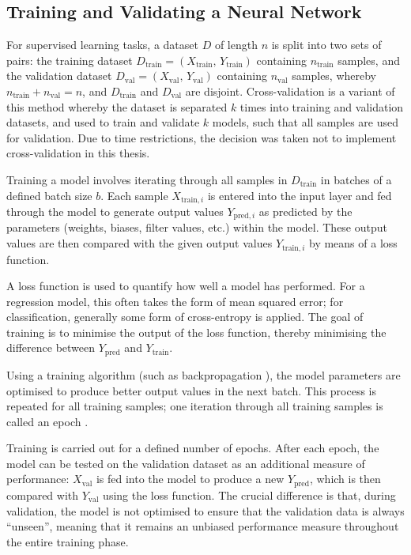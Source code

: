 \subsection{Training and Validating a Neural Network}
For supervised learning tasks, a dataset \(D\) of length \(n\) is split into two sets of pairs: the training dataset \(D_{\text{train}} = \left(X_{\text{train}},\,Y_{\text{train}}\right)\) containing \(n_{\text{train}}\) samples, and the validation dataset \(D_{\text{val}} = \left(X_{\text{val}},\,Y_{\text{val}}\right)\) containing \(n_{\text{val}}\) samples, whereby \(n_{\text{train}} + n_{\text{val}} = n\), and \(D_{\text{train}}\) and \(D_{\text{val}}\) are disjoint. Cross-validation is a variant of this method whereby the dataset is separated \(k\) times into training and validation datasets, and used to train and validate \(k\) models, such that all samples are used for validation. Due to time restrictions, the decision was taken not to implement cross-validation in this thesis.

Training a model involves iterating through all samples in \(D_{\text{train}}\) in batches of a defined batch size \(b\). Each sample \(X_{\text{train}, i}\) is entered into the input layer and fed through the model to generate output values \(Y_{\text{pred}, i}\) as predicted by the parameters (weights, biases, filter values, etc.) within the model. These output values are then compared with the given output values \(Y_{\text{train}, i}\) by means of a loss function.

A loss function is used to quantify how well a model has performed. For a regression model, this often takes the form of mean squared error; for classification, generally some form of cross-entropy is applied. The goal of training is to minimise the output of the loss function, thereby minimising the difference between \(Y_{\text{pred}}\) and \(Y_{\text{train}}\).

Using a training algorithm (such as backpropagation \cite[p. 204]{goodfellow_deep_2016}), the model parameters are optimised to produce better output values in the next batch. This process is repeated for all training samples; one iteration through all training samples is called an epoch \cite[]{kirk_thoughtful_2017}.

Training is carried out for a defined number of epochs. After each epoch, the model can be tested on the validation dataset as an additional measure of performance: \(X_{\text{val}}\) is fed into the model to produce a new \(Y_{\text{pred}}\), which is then compared with \(Y_{\text{val}}\) using the loss function. The crucial difference is that, during validation, the model is not optimised to ensure that the validation data is always ``unseen'', meaning that it remains an unbiased performance measure throughout the entire training phase.

